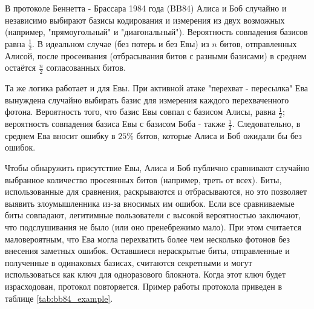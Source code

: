 В протоколе Беннетта - Брассара 1984 года (BB84) Алиса и Боб случайно и независимо выбирают базисы кодирования и измерения из двух возможных (например, "прямоугольный" и "диагональный"). Вероятность совпадения базисов равна $\frac{1}{2}$. В идеальном случае (без потерь и без Евы) из $n$ битов, отправленных Алисой, после просеивания (отбрасывания битов с разными базисами) в среднем остаётся $\frac{n}{2}$ согласованных битов.

Та же логика работает и для Евы. При активной атаке "перехват - пересылка" Ева вынуждена случайно выбирать базис для измерения каждого перехваченного фотона. Вероятность того, что базис Евы совпал с базисом Алисы, равна $\frac{1}{2}$; вероятность совпадения базиса Евы с базисом Боба - также $\frac{1}{2}$. Следовательно, в среднем Ева вносит ошибку в $25\%$ битов, которые Алиса и Боб ожидали бы без ошибок.

Чтобы обнаружить присутствие Евы, Алиса и Боб публично сравнивают случайно выбранное количество просеянных битов (например, треть от всех). Биты, использованные для сравнения, раскрываются и отбрасываются, но это позволяет выявить злоумышленника из-за вносимых им ошибок. Если все сравниваемые биты совпадают, легитимные пользователи с высокой вероятностью заключают, что подслушивания не было (или оно пренебрежимо мало). При этом считается маловероятным, что Ева могла перехватить более чем несколько фотонов без внесения заметных ошибок. Оставшиеся нераскрытые биты, отправленные и полученные в одинаковых базисах, считаются секретными и могут использоваться как ключ для одноразового блокнота. Когда этот ключ будет израсходован, протокол повторяется. Пример работы протокола приведен в таблице \ref{tab:bb84_example}.


